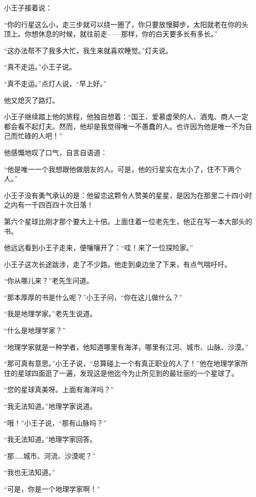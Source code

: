 小王子接着说：

“你的行星这么小，走三步就可以绕一圈了，你只要放慢脚步，太阳就老在你的头顶上。你想休息的时候，就往前走------那样，你的白天要多长有多长。”

“这办法帮不了我多大忙，我生来就喜欢睡觉。”灯夫说。

“真不走运。”小王子说。

“真不走运。”点灯人说，“早上好。”

他又熄灭了路灯。

小王子继续踏上他的旅程，他独自想着：“国王、爱慕虚荣的人、酒鬼、商人一定都会看不起灯夫。然而，他却是我觉得唯一不愚蠢的人。也许因为他是唯一不为自己而忙碌的人吧！”

他感慨地叹了口气，自言自语道：

“他是唯一一个我想跟他做朋友的人。可是，他的行星实在太小了，住不下两个人。”

小王子没有勇气承认的是：他留恋这颗令人赞美的星星，是因为在那里二十四小时之内有一千四百四十次日落！


\stoptitle

\starttitle[title={15}]

第六个星球比刚才那个要大上十倍。上面住着一位老先生，他正在写一本大部头的书。

他远远看到小王子走来，便嚷嚷开了：“哇！来了一位探险家。”

小王子这次长途跋涉，走了不少路。他走到桌边坐了下来，有点气喘吁吁。

“你从哪儿来？”老先生问道。

“那本厚厚的书是什么呢？”小王子问，“你在这儿做什么？”

“我是地理学家。”老先生说道。

“什么是地理学家？”

“地理学家就是一种学者，他知道哪里有海洋，哪里有江河、城市、山脉、沙漠。”

“那可真有意思。”小王子说，“总算碰上一个有真正职业的人了！”他在地理学家所住的星球四面逛了一遍，发现这是他迄今为止所见到的最壮丽的一个星球了。

“您的星球真美呀。上面有海洋吗？”

“我无法知道。”地理学家说道。

“哦！”小王子说，“那有山脉吗？”

“我无法知道。”地理学家回答。

“那\ldots{}\ldots{}城市、河流、沙漠呢？”

“我也无法知道。”

“可是，你是一个地理学家啊！”

